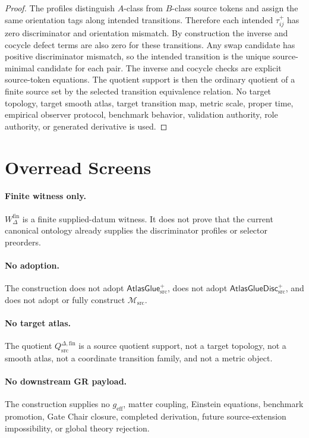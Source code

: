 \documentclass[11pt]{article}
\newcommand{\Msrc}{\mathcal{M}_{\mathrm{src}}}
\newcommand{\geff}{g_{\mathrm{eff}}}
\newcommand{\AtlasGlue}{\mathsf{AtlasGlue}_{\mathrm{src}}^{+}}
\newcommand{\AtlasGlueDisc}{\mathsf{AtlasGlueDisc}_{\mathrm{src}}^{+}}
\newcommand{\Qdisc}{Q_{\mathrm{src}}^{\Delta,\mathrm{fin}}}
\newcommand{\Wfin}{W_{\Delta}^{\mathrm{fin}}}
\begin{document}
\begin{proof}
The profiles distinguish \(A\)-class from \(B\)-class source tokens and assign
the same orientation tags along intended transitions. Therefore each intended
\(\tau_{ij}^{+}\) has zero discriminator and orientation mismatch. By
construction the inverse and cocycle defect terms are also zero for these
transitions. Any swap candidate has positive discriminator mismatch, so the
intended transition is the unique source-minimal candidate for each pair.
The inverse and cocycle checks are explicit source-token equations. The
quotient support is then the ordinary quotient of a finite source set by the
selected transition equivalence relation. No target topology, target smooth
atlas, target transition map, metric scale, proper time, empirical observer
protocol, benchmark behavior, validation authority, role authority, or
generated derivative is used.
\end{proof}

\section{Overread Screens}

\paragraph{Finite witness only.}
\(\Wfin\) is a finite supplied-datum witness. It does not prove that the
current canonical ontology already supplies the discriminator profiles or
selector preorders.

\paragraph{No adoption.}
The construction does not adopt \(\AtlasGlue\), does not adopt
\(\AtlasGlueDisc\), and does not adopt or fully construct \(\Msrc\).

\paragraph{No target atlas.}
The quotient \(\Qdisc\) is a source quotient support, not a target topology,
not a smooth atlas, not a coordinate transition family, and not a metric
object.

\paragraph{No downstream GR payload.}
The construction supplies no \(\geff\), matter coupling, Einstein equations,
benchmark promotion, Gate Chair closure, completed derivation, future
source-extension impossibility, or global theory rejection.
\end{document}
